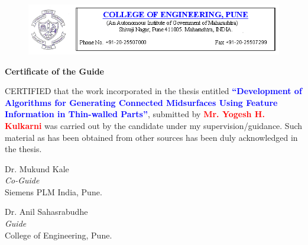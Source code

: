 \begin{figure} [!h]
	\centering
	\includegraphics[width=\linewidth]{..//Common/images/coep_header.png}
\end{figure}

\vspace*{50pt}

\begin{center}{\Huge \textbf{Certificate of the Guide}}\end{center}

\vspace*{20pt}

\begin{flushleft}
CERTIFIED that the work incorporated in the thesis entitled  \textcolor{blue}{\textbf{``Development of Algorithms for Generating Connected Midsurfaces Using Feature Information in Thin-walled Parts''}}, submitted by \textcolor{red}{\textbf{Mr. Yogesh H. Kulkarni}} was carried out by the candidate under my supervision/guidance. Such material as has been obtained from other sources has been duly acknowledged in the thesis. 
\end{flushleft}

\vspace*{120pt}


\begin{minipage}[t]{0.5\textwidth}%
\begin{flushleft}
 Dr. Mukund Kale\\
\emph{Co-Guide}\\
Siemens PLM India, Pune.
\end{flushleft}
\end{minipage}\hspace{0.5cm}
\begin{minipage}[t]{0.4\textwidth}%
\begin{flushleft}
 {
Dr. Anil Sahasrabudhe \\
\emph{Guide}}\\
College of Engineering, Pune.
\end{flushleft}
\end{minipage}
%
%
%


